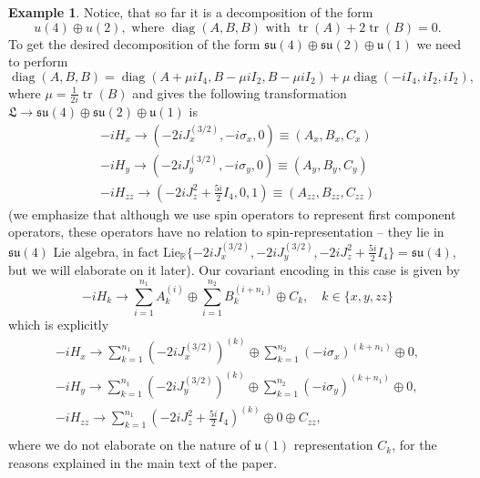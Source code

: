 \documentclass[11pt,letterpaper]{article}
\newcounter{alg}
\theoremstyle{plain}
\theoremstyle{plain}
\theoremstyle{plain}
\theoremstyle{plain}
\theoremstyle{plain}
\theoremstyle{plain}
\newcommand{\R}{\mathbb{R}}
\newcommand{\Lie}{\mathrm{Lie}}
\theoremstyle{plain}
\theoremstyle{definition}
\newtheorem{smexample}[smtheorem]{Example}
\theoremstyle{plain}
\begin{document}
\begin{smexample}
Notice, that so far it is a decomposition of the form
\[
    u(4) \oplus u(2),\text { where } \operatorname{diag}(A, B, B) \text { with } \operatorname{tr}(A)+2 \operatorname{tr}(B)=0.
\]
To get the desired decomposition of the form $\mathfrak{su}(4)\oplus \mathfrak{su}(2)\oplus \mathfrak{u}(1)$  we need to perform
\[
   \operatorname{diag}(A, B, B)=\operatorname{diag}(A+\mu i I_4, B-\mu i I_2, B-\mu i I_2) + \mu\operatorname{diag}\left(-i I_4, i I_2, i I_2\right),
\]
where $\mu=\frac{1}{2 i} \operatorname{tr}(B)$ and gives the following transformation $\mathfrak{L} \rightarrow \mathfrak{su}(4)\oplus \mathfrak{su}(2)\oplus \mathfrak{u}(1)$ is 
\[
\begin{gathered}
    -i H_x \longrightarrow \left(-2 i J_x^{(3 / 2)}, -i \sigma_x, 0 \right)\equiv \left(A_x, B_x, C_x \right) \\
    -i H_y \longrightarrow \left(-2 i J_y^{(3 / 2)}, -i \sigma_y, 0 \right)\equiv \left(A_y, B_y, C_y \right) \\
    -i H_{z z} \longrightarrow \left(-2 i J_z^2+\frac{5 i}{2} I_4, 0, 1\right)\equiv \left(A_{zz}, B_{zz}, C_{zz} \right)
\end{gathered}
\]
(we emphasize that although we use spin operators to represent first component operators, these operators have no relation to spin-representation -- they lie in $\mathfrak{su}(4)$ Lie algebra,
in fact $\Lie_{\R} \{-2 i J_x^{(3 / 2)}, -2 i J_y^{(3 / 2)}, -2 i J_z^2+\frac{5 i}{2} I_4\}=\mathfrak{su}(4)$, but we will elaborate on it later).
Our covariant encoding in this case is given by
\[
    -iH_k \longrightarrow \sum_{i=1}^{n_1} A_k^{(i)} \oplus \sum_{i=1}^{n_2} B_k^{(i+n_1)} \oplus C_k, \quad k\in\{x,y,zz\}
\]
which is explicitly
\[
\begin{gathered}
    -i H_x \longrightarrow \sum_{k=1}^{n_1} \left(-2 i J_x^{(3 / 2)}\right)^{(k)} \oplus \sum_{k=1}^{n_2} \left( -i \sigma_x\right)^{(k+n_1)}\oplus 0,\\
    -i H_y \longrightarrow \sum_{k=1}^{n_1} \left(-2 i J_y^{(3 / 2)}\right)^{(k)} \oplus \sum_{k=1}^{n_2} \left( -i \sigma_y\right)^{(k+n_1)}\oplus 0,\\
    -i H_{z z} \longrightarrow \sum_{k=1}^{n_1} \left(-2 i J_z^2+\frac{5 i}{2} I_4\right)^{(k)} \oplus 0 \oplus C_{zz},\\
\end{gathered}
\]
where we do not elaborate on the nature of $\mathfrak{u}(1)$ representation $C_{k}$, for the reasons explained in the main text of the paper.
\end{smexample}
\end{document}
